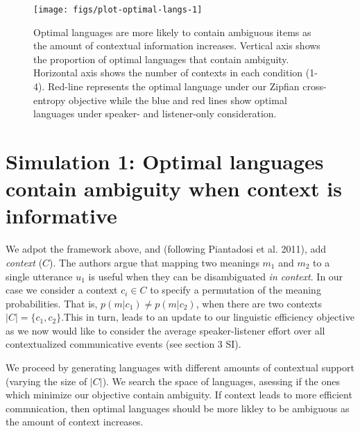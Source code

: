 \documentclass[10pt, letterpaper]{article}
\newenvironment{CodeChunk}{}{}
\begin{document}
\begin{CodeChunk}
\begin{figure*}[h]

{\centering \texttt{[image: figs/plot-optimal-langs-1]} 

}

\caption[Optimal languages are more likely to contain ambiguous items as the amount of contextual information increases]{Optimal languages are more likely to contain ambiguous items as the amount of contextual information increases. Vertical axis shows the proportion of optimal languages that contain ambiguity. Horizontal axis shows the number of contexts in each condition (1-4). Red-line represents the optimal language under our Zipfian cross-entropy objective while the blue and red lines show optimal languages under speaker- and listener-only consideration.}\label{fig:plot-optimal-langs}
\end{figure*}
\end{CodeChunk}

\section{Simulation 1: Optimal languages contain ambiguity when context
is
informative}\label{simulation-1-optimal-languages-contain-ambiguity-when-context-is-informative}

We adpot the framework above, and (following Piantadosi et al. 2011),
add \textit{context} (\(C\)). The authors argue that mapping two
meanings \(m_1\) and \(m_2\) to a single utterance \(u_1\) is useful
when they can be disambiguated \emph{in context}. In our case we
consider a context \(c_i \in C\) to specify a permutation of the meaning
probabilities. That is, \(p(m|c_1) \neq p(m|c_2)\), when there are two
contexts \(|C| = \{c_1, c_2\}\).This in turn, leads to an update to our
linguistic efficiency objective as we now would like to consider the
average speaker-listener effort over all contextualized communicative
events (see section 3 SI).\par

We proceed by generating languages with different amounts of contextual
support (varying the size of \(|C|\)). We search the space of languages,
asessing if the ones which minimize our objective contain ambiguity. If
context leads to more efficient commnication, then optimal languages
should be more likley to be ambiguous as the amount of context
increases.\par
\end{document}
